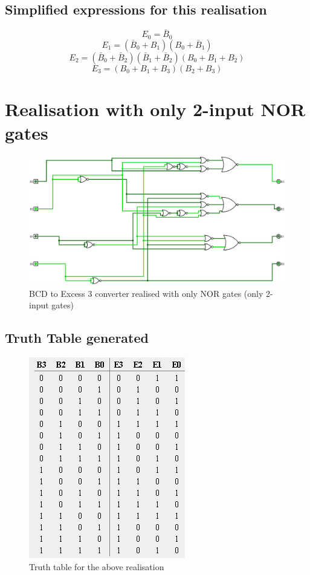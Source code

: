 \documentclass[12pt]{article}
\begin{document}
\subsection{Simplified expressions for this realisation}
$$E_0=\bar{B}_0$$
$$E_1=(\bar{B}_0+B_1)(B_0+\bar{B}_1)$$
$$E_2=(\bar{B}_0+\bar{B}_2)(\bar{B}_1+\bar{B}_2)(B_0+B_1+B_2)$$
$$E_3=(B_0+B_1+B_3)(B_2+B_3)$$
\newpage
\section{Realisation with only 2-input NOR gates}
\begin{center}
    \begin{figure}[ht]
        \includegraphics[scale=0.30]{only2nors.png}
        \caption{BCD to Excess 3 converter realised with only NOR gates (only 2-input gates)}
    \end{figure}
\end{center}
\newpage
\subsection{Truth Table generated}
\begin{center}
    \begin{figure}[ht]
        \includegraphics{ttonly2nors.jpg}
        \caption{Truth table for the above realisation}
    \end{figure}
\end{center}
\end{document}
